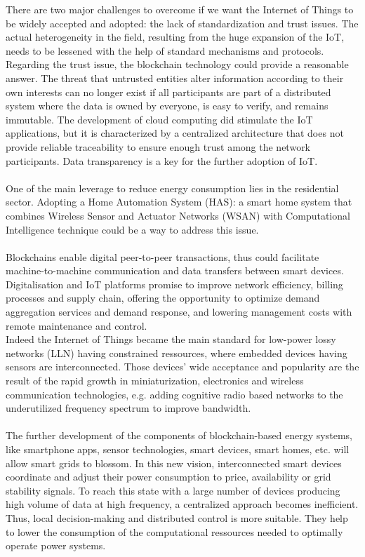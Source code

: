 \documentclass[11pt]{article}
\begin{document}
There are two major challenges to overcome if we want the Internet of Things to be widely accepted and adopted: the lack of standardization and trust issues. The actual heterogeneity in the field, resulting from the huge expansion of the IoT, needs to be lessened with the help of standard mechanisms and protocols. Regarding the trust issue, the blockchain technology could provide a reasonable answer. The threat that untrusted entities alter information according to their own interests can no longer exist if all participants are part of a distributed system where the data is owned by everyone, is easy to verify, and remains immutable. The development of cloud computing did stimulate the IoT applications, but it is characterized by a centralized architecture that does not provide reliable traceability to ensure enough trust among the network participants. Data transparency is a key for the further adoption of IoT.\cite{21}\\\\
One of the main leverage to reduce energy consumption lies in the residential sector. Adopting a Home Automation System (HAS): a smart home system that combines Wireless Sensor and Actuator Networks (WSAN) with Computational Intelligence technique could be a way to address this issue.\cite{15}\\\\
Blockchains enable digital peer-to-peer transactions, thus could facilitate machine-to-machine communication and data transfers between smart devices. Digitalisation and IoT platforms promise to improve network efficiency, billing processes and supply chain, offering the opportunity to optimize demand aggregation services and demand response, and lowering management costs with remote maintenance and control.\cite{8}\\
Indeed the Internet of Things became the main standard for low-power lossy networks (LLN) having constrained ressources, where embedded devices having sensors are interconnected. Those devices' wide acceptance and popularity are the result of the rapid growth in miniaturization, electronics and wireless communication technologies, e.g. adding cognitive radio based networks to the underutilized frequency spectrum to improve bandwidth.\cite{9}\\\\
The further development of the components of blockchain-based energy systems, like smartphone apps, sensor technologies, smart devices, smart homes, etc. will allow smart grids to blossom. In this new vision, interconnected smart devices coordinate and adjust their power consumption to price, availability or grid stability signals. To reach this state with a large number of devices producing high volume of data at high frequency, a centralized approach becomes inefficient. Thus, local decision-making and distributed control is more suitable. They help to lower the consumption of the computational ressources needed to optimally operate power systems.\cite{8}\\
\end{document}
